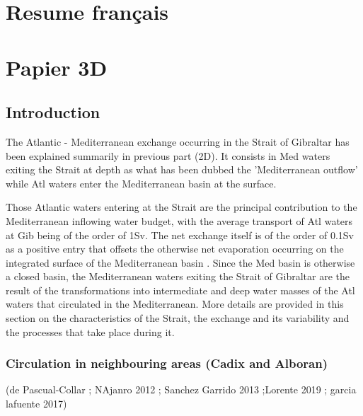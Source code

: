 \hypersetup{pdfborder=0 0 0}




\section{Resume français}




\section{Papier 3D}
\subsection{Introduction}

The Atlantic - Mediterranean exchange occurring in the Strait of Gibraltar has been explained summarily in previous part (2D). It consists in Med waters exiting the Strait at depth as what has been dubbed the 'Mediterranean outflow' while Atl waters enter the Mediterranean basin at the surface.

Those Atlantic waters entering at the Strait are the principal contribution to the Mediterranean inflowing water budget, with the average transport of Atl waters at Gib being of the order of 1Sv. The net exchange itself is of the order of 0.1Sv as a positive entry that offsets the otherwise net evaporation occurring on the integrated surface of the Mediterranean basin \citep{bryden_1994}.
Since the Med basin is otherwise a closed basin, the Mediterranean waters exiting the Strait of Gibraltar are the result of the transformations into intermediate and deep water masses of the Atl waters that circulated in the Mediterranean.
More details are provided in this section on the characteristics of the Strait, the exchange and its variability and the processes that take place during it.






\subsubsection{Circulation in neighbouring areas (Cadix and Alboran)}

(de Pascual-Collar ; NAjanro 2012 ; Sanchez Garrido 2013 ;Lorente 2019 ; garcia lafuente 2017)



